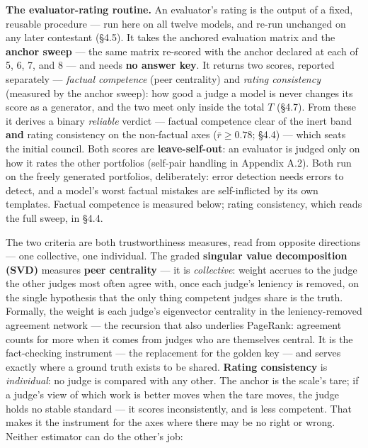 \textbf{The evaluator-rating routine.} An evaluator's rating is the output of a fixed, reusable procedure --- run here on all twelve models, and re-run unchanged on any later contestant (§4.5). It takes the anchored evaluation matrix and the \textbf{anchor sweep} --- the same matrix re-scored with the anchor declared at each of 5, 6, 7, and 8 --- and needs \textbf{no answer key}. It returns two scores, reported separately --- \emph{factual competence} (peer centrality) and \emph{rating consistency} (measured by the anchor sweep): how good a judge a model is never changes its score as a generator, and the two meet only inside the total \(T\) (§4.7). From these it derives a binary \emph{reliable} verdict --- factual competence clear of the inert band \textbf{and} rating consistency on the non-factual axes (\(\bar r \ge 0.78\); §4.4) --- which seats the initial council. Both scores are \textbf{leave-self-out}: an evaluator is judged only on how it rates the other portfolios (self-pair handling in Appendix A.2). Both run on the freely generated portfolios, deliberately: error detection needs errors to detect, and a model's worst factual mistakes are self-inflicted by its own templates. Factual competence is measured below; rating consistency, which reads the full sweep, in §4.4.

The two criteria are both trustworthiness measures, read from opposite directions --- one collective, one individual. The graded \textbf{singular value decomposition (SVD)} measures \textbf{peer centrality} --- it is \emph{collective}: weight accrues to the judge the other judges most often agree with, once each judge's leniency is removed, on the single hypothesis that the only thing competent judges share is the truth. Formally, the weight is each judge's eigenvector centrality in the leniency-removed agreement network --- the recursion that also underlies PageRank: agreement counts for more when it comes from judges who are themselves central. It is the fact-checking instrument --- the replacement for the golden key --- and serves exactly where a ground truth exists to be shared. \textbf{Rating consistency} is \emph{individual}: no judge is compared with any other. The anchor is the scale's tare; if a judge's view of which work is better moves when the tare moves, the judge holds no stable standard --- it scores inconsistently, and is less competent. That makes it the instrument for the axes where there may be no right or wrong. Neither estimator can do the other's job:

